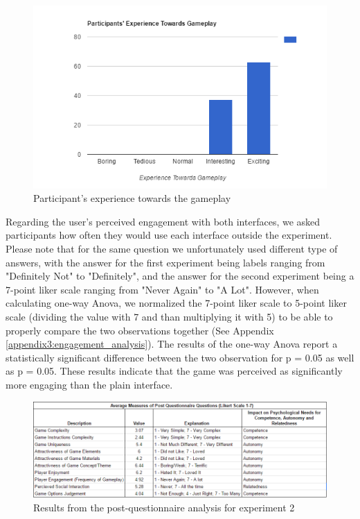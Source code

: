 \begin{figure}[]
    \centering
    \includegraphics[width=\linewidth]{figures/experiment2/game-participant-experience.PNG}
    \caption{Participant's experience towards the gameplay}
    \label{fig:game-experience}
\end{figure}

Regarding the user's perceived engagement with both interfaces, we asked participants how often they would use each interface outside the experiment. Please note that for the same question we unfortunately used different type of answers, with the answer for the first experiment being labels ranging from "Definitely Not" to "Definitely", and the answer for the second experiment being a 7-point liker scale ranging from "Never Again" to "A Lot". However, when calculating one-way Anova, we normalized the 7-point liker scale to 5-point liker scale (dividing the value with 7 and than multiplying it with 5) to be able to properly compare the two observations together (See Appendix \ref{appendix3:engagement_analysis}). The results of the one-way Anova report a statistically significant difference between the two observation for p = 0.05 as well as p = 0.05. These results indicate that the game was perceived as significantly more engaging than the plain interface.  


\begin{figure}[]
    \centering
    \includegraphics[width=\linewidth]{figures/experiment2/post-questionnaire-final.PNG}
    \caption{Results from the post-questionnaire analysis for experiment 2}
    \label{fig:post-questionnaire-final}
\end{figure}

